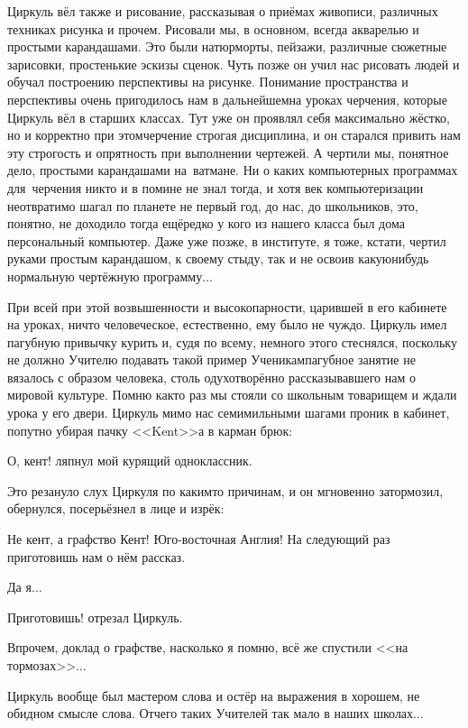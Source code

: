 Циркуль вёл также и рисование, рассказывая о приёмах живописи, различных техниках рисунка и прочем. Рисовали мы, в основном, всегда акварелью и простыми карандашами. Это были натюрморты, пейзажи, различные сюжетные зарисовки, простенькие эскизы сценок. Чуть позже он учил нас рисовать людей и обучал построению перспективы на рисунке. Понимание пространства и перспективы очень пригодилось нам в дальнейшем\mdash на уроках черчения, которые Циркуль вёл в старших классах. Тут уже он проявлял себя максимально жёстко, но и корректно при этом\mdash черчение строгая дисциплина, и он старался привить нам эту строгость и опрятность при выполнении чертежей. А чертили мы, понятное дело, простыми карандашами на~ватмане. Ни о каких компьютерных программах для~черчения никто и в помине не знал тогда, и хотя век компьютеризации неотвратимо шагал по планете не первый год, до нас, до школьников, это, понятно, не доходило тогда ещё\mdash редко у кого из нашего класса был дома персональный компьютер. Даже уже позже, в институте, я тоже, кстати, чертил руками простым карандашом, к своему стыду, так и не освоив какую\sdash нибудь нормальную чертёжную программу$\ldots$

При всей при этой возвышенности и высокопарности, царившей в его кабинете на уроках, ничто человеческое, естественно, ему было не чуждо. Циркуль имел пагубную привычку курить и, судя по всему, немного этого стеснялся, поскольку не должно Учителю подавать такой пример Ученикам\mdash пагубное занятие не вязалось с образом человека, столь одухотворённо рассказывавшего нам о мировой культуре. Помню как\sdash то раз мы стояли со школьным товарищем и ждали урока у его двери. Циркуль мимо нас семимильными шагами проник в кабинет, попутно убирая пачку <<Kent>>\sdash а в карман брюк:

\diagdash О, кент! \mdash ляпнул мой курящий одноклассник.

Это резануло слух Циркуля по каким\sdash то причинам, и он мгновенно затормозил, обернулся, посерьёзнел в лице и изрёк:

\diagdash Не кент, а графство Кент! Юго-восточная Англия! На следующий раз приготовишь нам о нём рассказ. 

\diagdash Да я$\ldots$

\diagdash Приготовишь! \mdash отрезал Циркуль.

Впрочем, доклад о графстве, насколько я помню, всё же спустили <<на тормозах>>$\ldots$

Циркуль вообще был мастером слова и остёр на выражения в хорошем, не обидном смысле слова. Отчего таких Учителей так мало в наших школах$\ldots$ 

